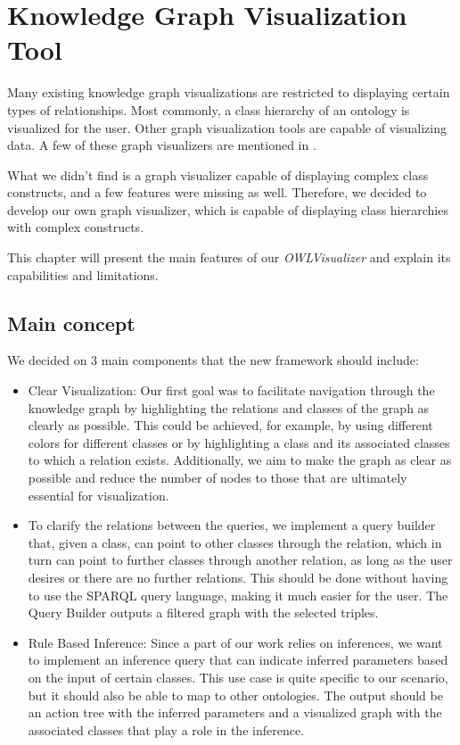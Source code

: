 \chapter{Knowledge Graph Visualization Tool}
Many existing knowledge graph visualizations are restricted to displaying certain types of relationships. 
Most commonly, a class hierarchy of an ontology is visualized for the user. Other graph visualization tools are capable of visualizing data.
 A few of these graph visualizers are mentioned in .

What we didn't find is a graph visualizer capable of displaying complex class constructs, and a few features were missing as well.
Therefore, we decided to develop our own graph visualizer, which is capable of displaying class hierarchies with complex constructs.

This chapter will present the main features of our \textit{OWLVisualizer} and explain its capabilities and limitations.

\section{Main concept}
\label{sec:MainConceps}

We decided on 3 main components that the new framework should include:
\begin{itemize}
    \item Clear Visualization: Our first goal was to facilitate navigation through the knowledge graph by highlighting the relations and classes of the graph as clearly as possible. This could be achieved, for example, by using different colors for different classes or by highlighting a class and its associated classes to which a relation exists. Additionally, we aim to make the graph as clear as possible and reduce the number of nodes to those that are ultimately essential for visualization.
    \item To clarify the relations between the queries, we implement a query builder that, given a class, can point to other classes through the relation, which in turn can point to further classes through another relation, as long as the user desires or there are no further relations. This should be done without having to use the SPARQL query language, making it much easier for the user. The Query Builder outputs a filtered graph with the selected triples.
    \item Rule Based Inference: Since a part of our work relies on inferences, we want to implement an inference query that can indicate inferred parameters based on the input of certain classes. This use case is quite specific to our scenario, but it should also be able to map to other ontologies. The output should be an action tree with the inferred parameters and a visualized graph with the associated classes that play a role in the inference.
\end{itemize}

